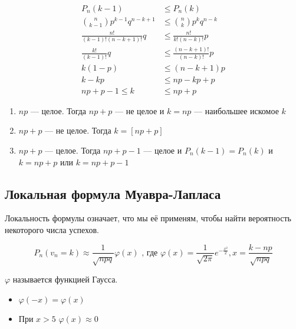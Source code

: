 \documentclass[12pt, a4paper, oneside]{book}
\begin{document}
\begin{align*}
    P_n(k - 1)                              & \leq P_n(k)                          \\
    \binom{n}{k - 1} p^{k - 1}q^{n - k + 1} & \leq \binom{n}{k} p^k q^{n - k}      \\
    \frac{n!}{(k - 1)!(n - k + 1)!} q       & \leq \frac{n!}{k!(n - k)!} p         \\
    \frac{k!}{(k - 1)!} q                   & \leq \frac{(n - k + 1)!}{(n - k)!} p \\
    k(1 - p)                                & \leq (n - k + 1) p                   \\
    k - kp                                  & \leq np - kp + p                     \\
    np + p - 1 \leq k                       & \leq np + p
\end{align*}

\begin{enumerate}
    \item \(np\) --- целое. Тогда \(np + p\) --- не целое и \(k = np\) --- наибольшее искомое \(k\)
    \item \(np + p\) --- не целое. Тогда \(k = [np + p]\)
    \item \(np + p\) --- целое. Тогда \(np + p - 1\) --- целое и \(P_n(k - 1) = P_n(k)\) и \(k = np + p\) или \(k = np + p - 1\)
\end{enumerate}

\subsection{Локальная формула Муавра-Лапласа}

\begin{remark}
    Локальность формулы означает, что мы её применям, чтобы найти вероятность некоторого числа успехов.
\end{remark}

\[P_n(v_n = k) \approx \frac{1}{\sqrt{n p q}} \varphi(x) \text{ , где } \varphi(x) = \frac{1}{\sqrt{2\pi}}e^{ -\frac{x^2}{2}}, x = \frac{k - np}{\sqrt{npq}} \]

\(\varphi\) называется функцией Гаусса.

\begin{prop}\itemfix
    \begin{itemize}
        \item \(\varphi( - x) = \varphi(x)\)
        \item При \( x > 5\) \(\varphi(x) \approx 0\)
    \end{itemize}
\end{prop}
\end{document}
